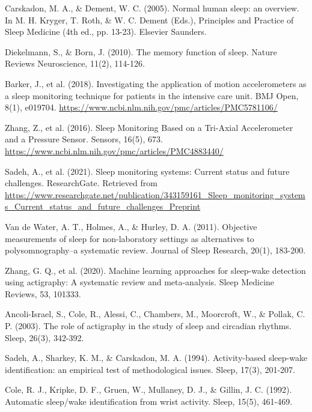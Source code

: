 \documentclass[conference]{IEEEtran}
\begin{document}
\begin{thebibliography}{1}

	Carskadon, M. A., \& Dement, W. C. (2005). Normal human sleep: an overview. In M. H. Kryger, T. Roth, \& W. C. Dement (Eds.), Principles and Practice of Sleep Medicine (4th ed., pp. 13-23). Elsevier Saunders.

	Diekelmann, S., \& Born, J. (2010). The memory function of sleep. Nature Reviews Neuroscience, 11(2), 114-126.

	Barker, J., et al. (2018). Investigating the application of motion accelerometers as a sleep monitoring technique for patients in the intensive care unit. BMJ Open, 8(1), e019704. \url{https://www.ncbi.nlm.nih.gov/pmc/articles/PMC5781106/}

	Zhang, Z., et al. (2016). Sleep Monitoring Based on a Tri-Axial Accelerometer and a Pressure Sensor. Sensors, 16(5), 673. \url{https://www.ncbi.nlm.nih.gov/pmc/articles/PMC4883440/}

	Sadeh, A., et al. (2021). Sleep monitoring systems: Current status and future challenges. ResearchGate. Retrieved from \url{https://www.researchgate.net/publication/343159161\_Sleep\_monitoring\_systems\_Current\_status\_and\_future\_challenges\_Preprint}

	Van de Water, A. T., Holmes, A., \& Hurley, D. A. (2011). Objective measurements of sleep for non-laboratory settings as alternatives to polysomnography–a systematic review. Journal of Sleep Research, 20(1), 183-200.

	Zhang, G. Q., et al. (2020). Machine learning approaches for sleep-wake detection using actigraphy: A systematic review and meta-analysis. Sleep Medicine Reviews, 53, 101333.

	Ancoli-Israel, S., Cole, R., Alessi, C., Chambers, M., Moorcroft, W., \& Pollak, C. P. (2003). The role of actigraphy in the study of sleep and circadian rhythms. Sleep, 26(3), 342-392.

	Sadeh, A., Sharkey, K. M., \& Carskadon, M. A. (1994). Activity-based sleep-wake identification: an empirical test of methodological issues. Sleep, 17(3), 201-207.

	Cole, R. J., Kripke, D. F., Gruen, W., Mullaney, D. J., \& Gillin, J. C. (1992). Automatic sleep/wake identification from wrist activity. Sleep, 15(5), 461-469.


\end{thebibliography}
\end{document}
